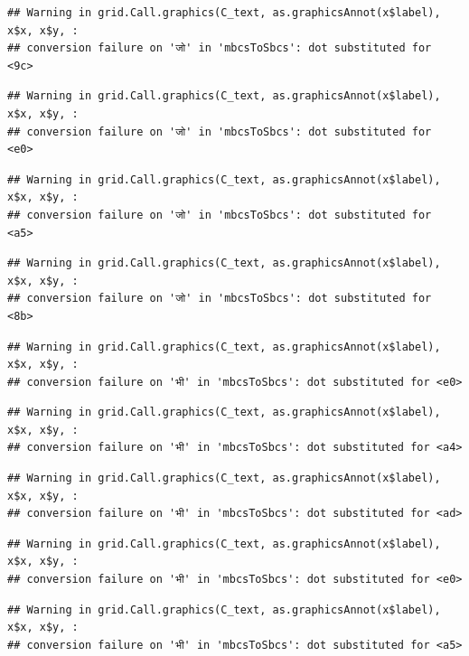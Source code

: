 \documentclass[
]{article}
\begin{document}
\begin{verbatim}
## Warning in grid.Call.graphics(C_text, as.graphicsAnnot(x$label), x$x, x$y, :
## conversion failure on 'जो' in 'mbcsToSbcs': dot substituted for <9c>
\end{verbatim}

\begin{verbatim}
## Warning in grid.Call.graphics(C_text, as.graphicsAnnot(x$label), x$x, x$y, :
## conversion failure on 'जो' in 'mbcsToSbcs': dot substituted for <e0>
\end{verbatim}

\begin{verbatim}
## Warning in grid.Call.graphics(C_text, as.graphicsAnnot(x$label), x$x, x$y, :
## conversion failure on 'जो' in 'mbcsToSbcs': dot substituted for <a5>
\end{verbatim}

\begin{verbatim}
## Warning in grid.Call.graphics(C_text, as.graphicsAnnot(x$label), x$x, x$y, :
## conversion failure on 'जो' in 'mbcsToSbcs': dot substituted for <8b>
\end{verbatim}

\begin{verbatim}
## Warning in grid.Call.graphics(C_text, as.graphicsAnnot(x$label), x$x, x$y, :
## conversion failure on 'भी' in 'mbcsToSbcs': dot substituted for <e0>
\end{verbatim}

\begin{verbatim}
## Warning in grid.Call.graphics(C_text, as.graphicsAnnot(x$label), x$x, x$y, :
## conversion failure on 'भी' in 'mbcsToSbcs': dot substituted for <a4>
\end{verbatim}

\begin{verbatim}
## Warning in grid.Call.graphics(C_text, as.graphicsAnnot(x$label), x$x, x$y, :
## conversion failure on 'भी' in 'mbcsToSbcs': dot substituted for <ad>
\end{verbatim}

\begin{verbatim}
## Warning in grid.Call.graphics(C_text, as.graphicsAnnot(x$label), x$x, x$y, :
## conversion failure on 'भी' in 'mbcsToSbcs': dot substituted for <e0>
\end{verbatim}

\begin{verbatim}
## Warning in grid.Call.graphics(C_text, as.graphicsAnnot(x$label), x$x, x$y, :
## conversion failure on 'भी' in 'mbcsToSbcs': dot substituted for <a5>
\end{verbatim}
\end{document}
